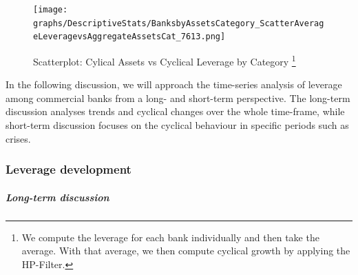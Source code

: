 \documentclass[12pt, a4paper]{article} %
\begin{document}
\begin{figure}[H]
\begin{minipage}{\textwidth}
\centering
\caption[1]{Scatterplot: Cylical Assets vs Cyclical Leverage by Category \footnote{We compute the leverage for each bank individually and then take the average. With that average, we then compute cyclical growth by applying the HP-Filter.}}
\texttt{[image: graphs/DescriptiveStats/BanksbyAssetsCategory\_ScatterAverageLeveragevsAggregateAssetsCat\_7613.png]}
\label{fig:ScatterCyclicalLeverageAssetsbyCat}
\end{minipage}
\end{figure}

In the following discussion, we will approach the time-series analysis of leverage among commercial banks from a long- and short-term perspective. The long-term discussion analyses trends and cyclical changes  over the whole time-frame, while short-term discussion focuses on the cyclical behaviour in specific periods such as crises.

\subsubsection{Leverage development}

\subparagraph{Long-term discussion} 
\end{document}
